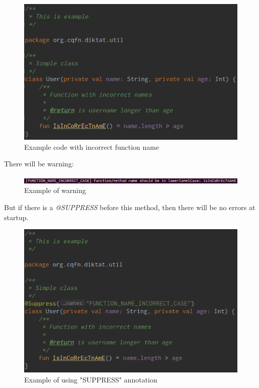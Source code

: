 \begin{figure}[H]
  \centering
  \includegraphics[scale=0.5]{wp/pictures/user_code.png}
  \caption{Example code with incorrect function name}   
\end{figure} 

There will be warning: 

\begin{figure}[H]
  \centering
  \includegraphics[scale=0.5]{wp/pictures/error.png}
  \caption{Example of warning}   
\end{figure} 

But if there is a \textsl{@SUPPRESS} before this method, then there will be no errors at startup.
\begin{figure}[H]
  \centering
  \includegraphics[scale=0.5]{wp/pictures/user_code_with_suppress.png}
  \caption{Example of using "SUPPRESS" annotation}   
\end{figure} 

